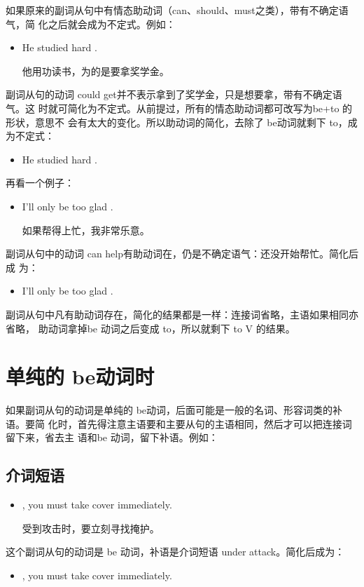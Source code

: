 如果原来的副词从句中有情态助动词（can、should、must之类），带有不确定语气，简
化之后就会成为不定式。例如：
\begin{itemize}
\item He studied hard .

  他用功读书，为的是要拿奖学金。
\end{itemize}
副词从句的动词 could get并不表示拿到了奖学金，只是想要拿，带有不确定语气。这
时就可简化为不定式。从前提过，所有的情态助动词都可改写为be+to 的形状，意思不
会有太大的变化。所以助动词的简化，去除了 be动词就剩下 to，成为不定式：
\begin{itemize}
\item He studied hard .
\end{itemize}

再看一个例子：
\begin{itemize}
\item I'll only be too glad .

  如果帮得上忙，我非常乐意。
\end{itemize}
副词从句中的动词 can help有助动词在，仍是不确定语气：还没开始帮忙。简化后成
为：
\begin{itemize}
\item   I'll only be too glad .
\end{itemize}

副词从句中凡有助动词存在，简化的结果都是一样：连接词省略，主语如果相同亦省略，
助动词拿掉be 动词之后变成 to，所以就剩下 to V 的结果。

\section{单纯的 be动词时}

如果副词从句的动词是单纯的 be动词，后面可能是一般的名词、形容词类的补语。要简
化时，首先得注意主语要和主要从句的主语相同，然后才可以把连接词留下来，省去主
语和be 动词，留下补语。例如：

\subsection{介词短语}

\begin{itemize}
\item {}, you must take cover immediately.

  受到攻击时，要立刻寻找掩护。
\end{itemize}
这个副词从句的动词是 be 动词，补语是介词短语 under attack。简化后成为：
\begin{itemize}
\item {}, you must take cover immediately.
\end{itemize}

